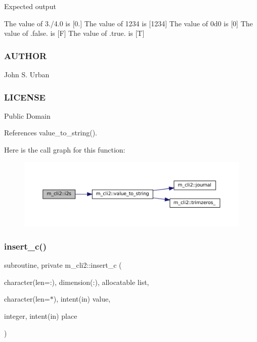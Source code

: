 Expected output

The value of 3./4.0 is \mbox{[}0.\mbox{]} The value of 1234 is \mbox{[}1234\mbox{]} The value of 0d0 is \mbox{[}0\mbox{]} The value of .false. is \mbox{[}F\mbox{]} The value of .true. is \mbox{[}T\mbox{]}

\subsubsection*{A\+U\+T\+H\+OR}

John S. Urban \subsubsection*{L\+I\+C\+E\+N\+SE}

Public Domain 

References value\+\_\+to\+\_\+string().

Here is the call graph for this function\+:\nopagebreak
\begin{figure}[H]
\begin{center}
\leavevmode
\includegraphics[width=350pt]{namespacem__cli2_aa106d3533fd6d4845f0b3e94b2a79ffb_cgraph}
\end{center}
\end{figure}
\mbox{\label{namespacem__cli2_ab3f2aa827b3b7ff419bcdc3ccb2672b3}} 
\subsubsection{\texorpdfstring{insert\+\_\+c()}{insert\_c()}}
{\footnotesize\ttfamily subroutine, private m\+\_\+cli2\+::insert\+\_\+c (\begin{DoxyParamCaption}\item[{character(len=\+:), dimension(\+:), allocatable}]{list,  }\item[{character(len=$\ast$), intent(in)}]{value,  }\item[{integer, intent(in)}]{place }\end{DoxyParamCaption})\hspace{0.3cm}{\ttfamily [private]}}



